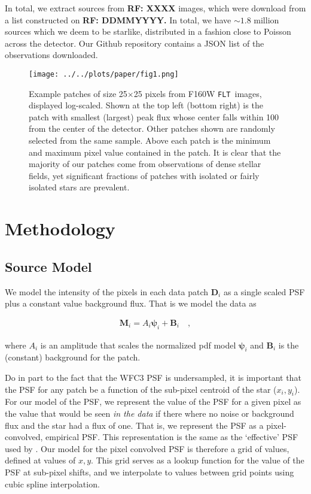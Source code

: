 \documentclass[12pt,letterpaper,preprint]{aastex}
\newcommand{\rf}[1]{\textbf{RF: #1}}
\newcommand{\vect}[1]{\mathbf{#1}}
\newcommand{\FLT}{\texttt{FLT}}
\newcommand{\data}{\vect{D}}
\newcommand{\model}{\vect{M}}
\newcommand{\bkg}{\vect{B}}
\newcommand{\psf}{\vect{\psi}}
\begin{document}
In total, we extract sources from \rf{XXXX} images, which were download from a list constructed on 
\rf{DDMMYYYY.}  In total, we have $\sim1.8$ million sources which we deem to be starlike, distributed 
in a fashion close to Poisson across the detector.  Our Github repository contains a JSON list of the
observations downloaded.

\begin{figure}
\centering
 \texttt{[image: ../../plots/paper/fig1.png]}
\caption{Example patches of size 25$\times$25 pixels from F160W \FLT\, images, displayed log-scaled.
Shown at the top left (bottom right) is the patch with smallest (largest) peak flux whose center falls within
100 from the center of the detector.  Other patches shown are randomly selected from the same sample.
Above each patch is the minimum and maximum pixel value contained in the patch.
It is clear that the majority of our patches come from observations of dense stellar fields, yet significant 
fractions of patches with isolated or fairly isolated stars are prevalent.}
\label{fig:data-examples}
\end{figure}



\section{Methodology}

\subsection{Source Model}
\label{ssec:model}

We model the intensity of the pixels in each data patch $\data_i$ as a single scaled PSF plus a constant value 
background flux.  That is we model the data as 

\begin{eqnarray}
\model_i =  A_i \psf_i + \bkg_i
\quad , 
\label{eqn:model-patch}
\end{eqnarray}

\noindent where $A_i$ is an amplitude that scales the normalized pdf model $\psf_i$ and $\bkg_i$ is 
the (constant) background for the patch.  

Do in part to the fact that the WFC3 PSF is undersampled,  it 
is important that the PSF for any patch be a function of the sub-pixel centroid of the star ($x_i, y_i$).  For 
our model of the PSF, we represent the value of the PSF for a given pixel as the value that would be 
seen \emph{in the data} if there where no noise or background flux and the star had a flux of one.  That 
is, we represent the PSF as a pixel-convolved, empirical PSF.  This representation is the same as the
 `effective' PSF used by \citet{anderson06}.  Our model for the pixel convolved PSF is therefore a grid 
 of values, defined at values of $x, y$.  This grid serves as a lookup function for the value of the PSF 
 at sub-pixel shifts, and we interpolate to values between grid points using cubic spline interpolation.
\end{document}
